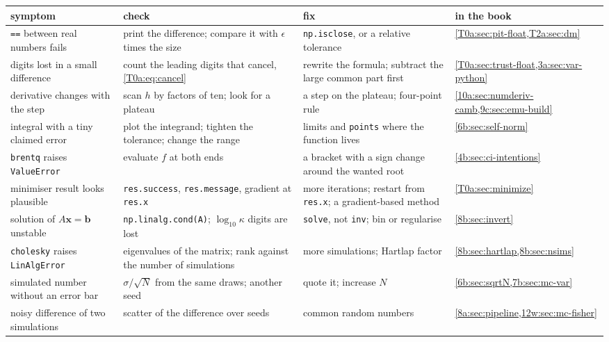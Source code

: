 \begin{table}[htbp]
\centering
\small
\renewcommand{\arraystretch}{1.15}
\begin{tabularx}{\linewidth}{@{}>{\raggedright\arraybackslash}p{2.9cm}
                               >{\raggedright\arraybackslash}X
                               >{\raggedright\arraybackslash}p{3.1cm}
                               >{\raggedright\arraybackslash}p{2.1cm}@{}}
\toprule
symptom & check & fix & in the book\\\midrule
\texttt{==} between real numbers fails & print the difference; compare it with $\epsilon$ times the size & \texttt{np.isclose}, or a relative tolerance & \cref{T0a:sec:pit-float,T2a:sec:dm}\\
digits lost in a small difference & count the leading digits that cancel, \eqref{T0a:eq:cancel} & rewrite the formula; subtract the large common part first & \cref{T0a:sec:trust-float,3a:sec:var-python}\\
derivative changes with the step & scan $h$ by factors of ten; look for a plateau & a step on the plateau; four-point rule & \cref{10a:sec:numderiv-camb,9c:sec:emu-build}\\
integral with a tiny claimed error & plot the integrand; tighten the tolerance; change the range & limits and \texttt{points} where the function lives & \cref{6b:sec:self-norm}\\
\texttt{brentq} raises \texttt{ValueError} & evaluate $f$ at both ends & a bracket with a sign change around the wanted root & \cref{4b:sec:ci-intentions}\\
minimiser result looks plausible & \texttt{res.success}, \texttt{res.message}, gradient at \texttt{res.x} & more iterations; restart from \texttt{res.x}; a gradient-based method & \cref{T0a:sec:minimize}\\
solution of $A\bm x=\bm b$ unstable & \texttt{np.linalg.cond(A)}; $\log_{10}\kappa$ digits are lost & \texttt{solve}, not \texttt{inv}; bin or regularise & \cref{8b:sec:invert}\\
\texttt{cholesky} raises \texttt{LinAlgError} & eigenvalues of the matrix; rank against the number of simulations & more simulations; Hartlap factor & \cref{8b:sec:hartlap,8b:sec:nsims}\\
simulated number without an error bar & $\sigma/\sqrt N$ from the same draws; another seed & quote it; increase $N$ & \cref{6b:sec:sqrtN,7b:sec:mc-var}\\
noisy difference of two simulations & scatter of the difference over seeds & common random numbers & \cref{8a:sec:pipeline,12w:sec:mc-fisher}\\

\end{tabularx}
\end{table}
